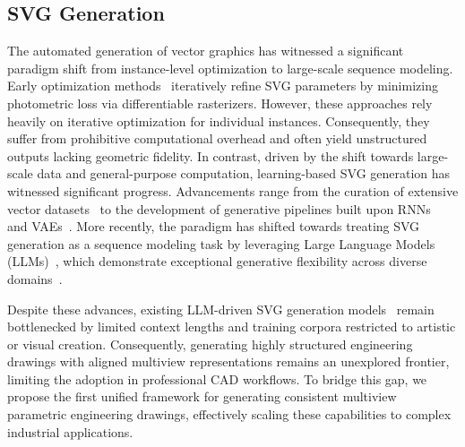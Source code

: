 \documentclass{article}
\begin{document}
\subsection{SVG Generation}
The automated generation of vector graphics has witnessed a significant paradigm shift from instance-level optimization to large-scale sequence modeling. Early optimization methods~\cite{ma2022towards,li2020differentiable} iteratively refine SVG parameters by minimizing photometric loss via differentiable rasterizers. However, these approaches rely heavily on iterative optimization for individual instances. Consequently, they suffer from prohibitive computational overhead and often yield unstructured outputs lacking geometric fidelity. In contrast, driven by the shift towards large-scale data and general-purpose computation, learning-based SVG generation has witnessed significant progress. Advancements range from the curation of extensive vector datasets~\cite{wang2021deepvecfont,clouatre2019figr,kocetkov2022stack,yang2025omnisvg} to the development of generative pipelines built upon RNNs~\cite{song2023clipvg,ha2017neural,reddy2021im2vec,hu2024supersvg} and VAEs~\cite{carlier2020deepsvg,lopes2019learned,tang2024strokenuwa,su2023marvel,tian2022modern}. More recently, the paradigm has shifted towards treating SVG generation as a sequence modeling task by leveraging Large Language Models (LLMs)~\cite{touvron2023llama,achiam2023gpt,yang2025qwen3,das2025security,vaswani2017attention}, which demonstrate exceptional generative flexibility across diverse domains~\cite{li2023fine,zhang2025collm,shojaee2024llm,zhang2024llama,jiang2023motiongpt,gu2025effectiveness,dong2025codescore}.

Despite these advances, existing LLM-driven SVG generation models~\cite{xing2025empowering,rodriguez2025starvector,wu2025chat2svg,yang2025omnisvg} remain bottlenecked by limited context lengths and training corpora restricted to artistic or visual creation. Consequently, generating highly structured engineering drawings with aligned multiview representations remains an unexplored frontier, limiting the adoption in professional CAD workflows. To bridge this gap, we propose the first unified framework for generating consistent multiview parametric engineering drawings, effectively scaling these capabilities to complex industrial applications.
\end{document}
